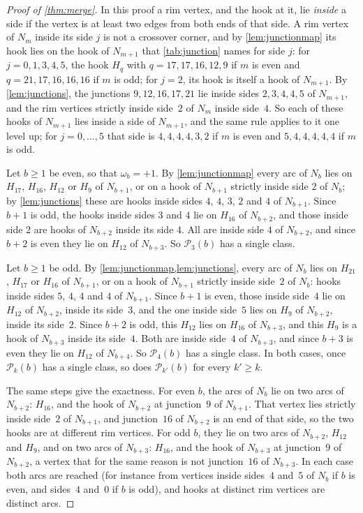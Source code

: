 \documentclass[11pt]{amsart}
\theoremstyle{definition}
\theoremstyle{remark}
\begin{document}
\begin{proof}[Proof of \cref{thm:merge}]
In this proof a rim vertex, and the hook at it, lie \emph{inside} a side if the vertex is at least two edges from both
ends of that side. A rim vertex of $N_m$ inside its side $j$ is not a crossover corner, and by \cref{lem:junctionmap}
its hook lies on the hook of $N_{m+1}$ that \cref{tab:junction} names for side $j$: for $j=0,1,3,4,5$, the hook $H_q$
with $q=17,17,16,12,9$ if $m$ is even and $q=21,17,16,16,16$ if $m$ is odd; for $j=2$, its hook is itself a hook of
$N_{m+1}$. By \cref{lem:junctions}, the junctions $9,12,16,17,21$ lie inside sides $2,3,4,4,5$ of $N_{m+1}$, and the
rim vertices strictly inside side~$2$ of $N_m$ inside side~$4$. So each of these hooks of $N_{m+1}$ lies inside a side
of $N_{m+1}$, and the same rule applies to it one level up; for $j=0,\dots,5$ that side is $4,4,4,4,3,2$ if $m$ is even
and $5,4,4,4,4,4$ if $m$ is odd.

Let $b\ge1$ be even, so that $\omega_b=+1$. By \cref{lem:junctionmap} every arc of $N_b$ lies on $H_{17}$, $H_{16}$,
$H_{12}$ or $H_9$ of $N_{b+1}$, or on a hook of $N_{b+1}$ strictly inside side $2$ of $N_b$; by \cref{lem:junctions}
these are hooks inside sides $4$, $4$, $3$, $2$ and $4$ of $N_{b+1}$. Since $b+1$ is odd, the hooks inside sides $3$ and
$4$ lie on $H_{16}$ of $N_{b+2}$, and those inside side $2$ are hooks of $N_{b+2}$ inside its side $4$. All are inside
side $4$ of $N_{b+2}$, and since $b+2$ is even they lie on $H_{12}$ of $N_{b+3}$. So $\mathcal P_3(b)$ has a single
class.

Let $b\ge1$ be odd. By \cref{lem:junctionmap,lem:junctions}, every arc of $N_b$ lies on $H_{21}$, $H_{17}$ or $H_{16}$
of $N_{b+1}$, or on a hook of $N_{b+1}$ strictly inside side~$2$ of $N_b$: hooks inside sides $5$, $4$, $4$ and $4$ of
$N_{b+1}$. Since $b+1$ is even, those inside side~$4$ lie on $H_{12}$ of $N_{b+2}$, inside its side~$3$, and the one
inside side~$5$ lies on $H_9$ of $N_{b+2}$, inside its side~$2$. Since $b+2$ is odd, this $H_{12}$ lies on $H_{16}$ of
$N_{b+3}$, and this $H_9$ is a hook of $N_{b+3}$ inside its side~$4$. Both are inside side~$4$ of $N_{b+3}$, and since
$b+3$ is even they lie on $H_{12}$ of $N_{b+4}$. So $\mathcal P_4(b)$ has a single class. In both cases, once
$\mathcal P_k(b)$ has a single class, so does $\mathcal P_{k'}(b)$ for every $k'\ge k$.

The same steps give the exactness. For even $b$, the arcs of $N_b$ lie on two arcs of $N_{b+2}$: $H_{16}$, and the hook
of $N_{b+2}$ at junction~$9$ of $N_{b+1}$. That vertex lies strictly inside side~$2$ of $N_{b+1}$, and junction~$16$ of
$N_{b+2}$ is an end of that side, so the two hooks are at different rim vertices. For odd $b$, they lie on two arcs of
$N_{b+2}$, $H_{12}$ and $H_9$, and on two arcs of $N_{b+3}$: $H_{16}$, and the hook of $N_{b+3}$ at junction~$9$ of
$N_{b+2}$, a vertex that for the same reason is not junction~$16$ of $N_{b+3}$. In each case both arcs are reached (for
instance from vertices inside sides~$4$ and~$5$ of $N_b$ if $b$ is even, and sides~$4$ and~$0$ if $b$ is odd), and hooks
at distinct rim vertices are distinct arcs.
\end{proof}
\end{document}
